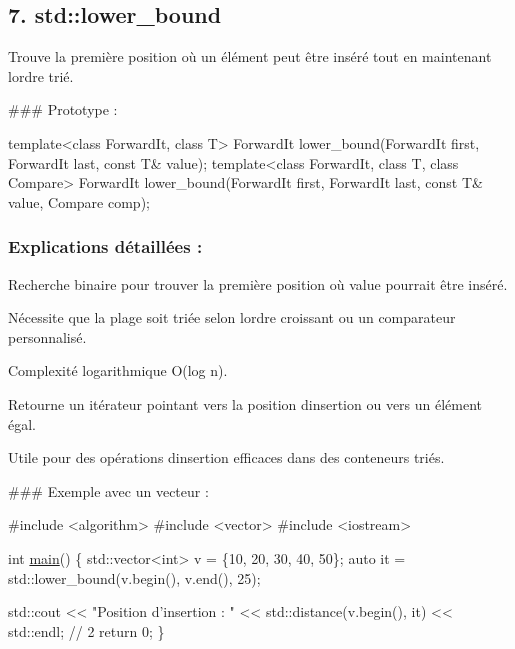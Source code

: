 \subsection*{7. {\bfseries std\+::lower\+\_\+bound}}

Trouve la première position où un élément peut être inséré tout en maintenant l\textquotesingle{}ordre trié.

\#\#\# Prototype \+: 
\begin{DoxyCode}
\textcolor{keyword}{template}<\textcolor{keyword}{class} ForwardIt, \textcolor{keyword}{class} T>
ForwardIt lower\_bound(ForwardIt first, ForwardIt last, \textcolor{keyword}{const} T& value);
\textcolor{keyword}{template}<\textcolor{keyword}{class} ForwardIt, \textcolor{keyword}{class} T, \textcolor{keyword}{class} Compare>
ForwardIt lower\_bound(ForwardIt first, ForwardIt last, \textcolor{keyword}{const} T& value, Compare comp);
\end{DoxyCode}


\subsubsection*{Explications détaillées \+:}


\begin{DoxyItemize}
\item Recherche binaire pour trouver la première position où {\ttfamily value} pourrait être inséré.
\item Nécessite que la plage soit triée selon l\textquotesingle{}ordre croissant ou un comparateur personnalisé.
\item Complexité logarithmique O(log n).
\item Retourne un itérateur pointant vers la position d\textquotesingle{}insertion ou vers un élément égal.
\item Utile pour des opérations d\textquotesingle{}insertion efficaces dans des conteneurs triés.
\end{DoxyItemize}

\#\#\# Exemple avec un vecteur \+: 
\begin{DoxyCode}
\textcolor{preprocessor}{#include <algorithm>}
\textcolor{preprocessor}{#include <vector>}
\textcolor{preprocessor}{#include <iostream>}

\textcolor{keywordtype}{int} \hyperlink{htop_8c_a3c04138a5bfe5d72780bb7e82a18e627}{main}() \{
    std::vector<int> v = \{10, 20, 30, 40, 50\};
    \textcolor{keyword}{auto} it = std::lower\_bound(v.begin(), v.end(), 25);

    std::cout << \textcolor{stringliteral}{"Position d'insertion : "} << std::distance(v.begin(), it) << std::endl; \textcolor{comment}{// 2}
    \textcolor{keywordflow}{return} 0;
\}
\end{DoxyCode}
 



